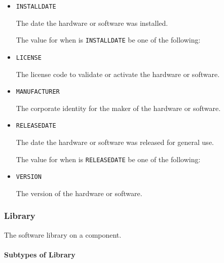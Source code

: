 \begin{itemize}

\item \texttt{INSTALL\textunderscore DATE}


The date the hardware or software was installed.


The value for  when  is \texttt{INSTALL\textunderscore DATE} \MUST be one of the following: 

\item \texttt{LICENSE}


The license code to validate or activate the hardware or software.

\item \texttt{MANUFACTURER}


The corporate identity for the maker of the hardware or software.


\item \texttt{RELEASE\textunderscore DATE}


The date the hardware or software was released for general use.



The value for  when  is \texttt{RELEASE\textunderscore DATE} \MUST be one of the following: 

\item \texttt{VERSION}


The version of the hardware or software.


\end{itemize}








\subsubsection{Library}
\label{sec:Library}



The software library on a component.



\paragraph{Subtypes of Library}\mbox{}
\label{sec:Subtypes of Library}

